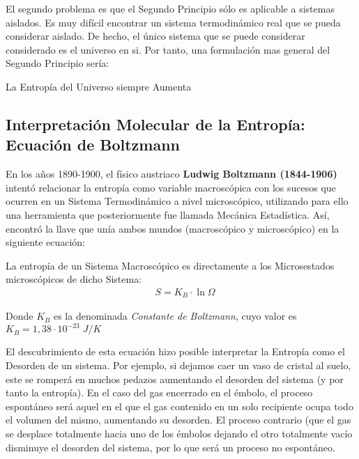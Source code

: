 El segundo problema es que el Segundo Principio sólo es aplicable a sistemas aislados. Es muy difícil encontrar un sistema termodinámico real que se pueda considerar aislado. De hecho, el único sistema que se puede considerar considerado es el universo en si. Por tanto, una formulación mas general del Segundo Principio sería:\\

\begin{definition}
	La Entropía del Universo siempre Aumenta
\end{definition}

\subsection{Interpretación Molecular de la Entropía: Ecuación de Boltzmann}

En los años 1890-1900, el físico austriaco \textbf{Ludwig Boltzmann (1844-1906)} intentó relacionar la entropía como variable macroscópica con los sucesos que ocurren en un Sistema Termodinámico a nivel microscópico, utilizando para ello una herramienta que posteriormente fue llamada Mecánica Estadística. Así, encontró la llave que unía ambos mundos (macroscópico y microscópico) en la siguiente ecuación:\\

\begin{definition}
	La entropía de un Sistema Macroscópico es directamente a los Microsestados microscópicos de dicho Sistema:
	\begin{align}
		& S = K_B \cdot \ln \Omega
	\end{align}
	
	Donde $K_B$ es la denominada \emph{Constante de Boltzmann}, cuyo valor es $K_B = 1,38 \cdot 10^{-23}\; J/K$
	
\end{definition}

El descubrimiento de esta ecuación hizo posible interpretar la Entropía como el Desorden de un sistema. Por ejemplo, si dejamos caer un vaso de cristal al suelo, este se romperá en muchos pedazos aumentando el desorden del sistema (y por tanto la entropía). En el caso del gas encerrado en el émbolo, el proceso espontáneo será aquel en el que el gas contenido en un solo recipiente ocupa todo el volumen del mismo, aumentando su desorden. El proceso contrario (que el gas se desplace totalmente hacia uno de los émbolos dejando el otro totalmente vacío disminuye el desorden del sistema, por lo que será un proceso no espontáneo. 

